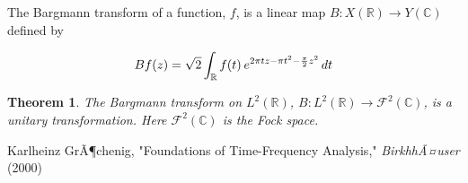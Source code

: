 \documentclass[12pt]{article}
\newtheorem*{thm}{Theorem}
\begin{document}
The Bargmann transform of a function, $f$, is a linear map $B: X(\mathbb{R}) \to Y(\mathbb{C})$ defined by

$$ B f(z)=\sqrt{2} \int_\mathbb{R} f(t)  \hskip2pt e^{2\pi t z-\pi t^2 - \frac{\pi}{2} z^2}\, dt $$

\begin{thm}
The Bargmann transform on $L^2(\mathbb{R})$, $B: L^2(\mathbb{R}) \to \mathcal{F}^2(\mathbb{C})$, is a unitary transformation. Here $\mathcal{F}^2(\mathbb{C})$ is the Fock space.
\end{thm}



\begin{thebibliography}{1}
 Karlheinz GrÃ¶chenig, "Foundations of Time-Frequency Analysis," {\it BirkhhÃ¤user} (2000)
\end{thebibliography}
\end{document}
